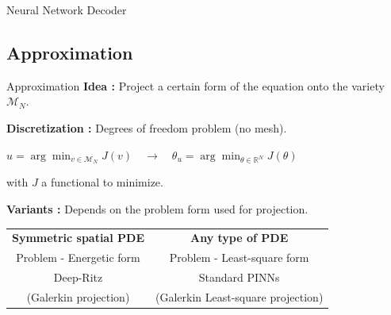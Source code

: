 \begin{frame}{Neural Network Decoder}
\begin{itemize}[\textbullet]
\begin{center}
\begin{minipage}{0.4\linewidth}
			\end{minipage}
		\end{center}
	\end{itemize}
\end{frame}

\subsection{Approximation}

\begin{frame}{Approximation}
	\textbf{Idea :} Project a certain form of the equation onto the variety $\mathcal{M}_N$. \\
	
	\vspace{10pt}
	
	\textbf{Discretization :} Degrees of freedom problem (no mesh).
	\begin{center}
		$u=\arg\min_{v\in \mathcal{M}_N} J(v) \quad \longrightarrow \quad \theta_u=\arg\min_{\theta\in \mathbb{R}^N} J(\theta) $
	\end{center}
	with $J$ a functional to minimize.
	
	\vspace{10pt}
	
	\textbf{Variants :} Depends on the problem form used for projection.
	
	\begin{center}
		\begin{tabular}{c|c}
			\textbf{Symmetric spatial PDE} & \textbf{Any type of PDE} \\
			Problem - Energetic form & Problem - Least-square form \\
			Deep-Ritz & Standard PINNs \\
			(Galerkin projection) & (Galerkin Least-square projection)
		\end{tabular}
	\end{center}
\end{frame}

